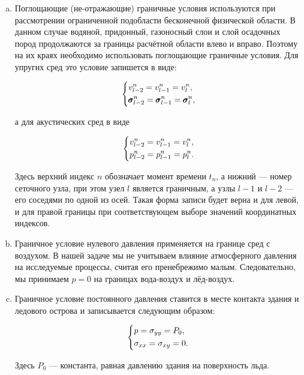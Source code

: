 \begin{enumerate}[a.]
    \item Поглощающие (не-отражающие) граничные условия используются при рассмотрении ограниченной подобласти бесконечной физической области. В данном случае водяной, придонный, газоносный слои и слой осадочных пород продолжаются за границы расчётной области влево и вправо. Поэтому на их краях необходимо использовать поглощающие граничные условия.  Для упругих сред это условие запишется в виде:
    
    \begin{equation*}
    \begin{dcases}
        v_{l-2}^n = 
        v_{l-1}^n = 
        v_{l}^n , \\
        \pmb{\sigma}_{l-2}^n = 
        \pmb{\sigma}_{l-1}^n = 
        \pmb{\sigma}_{l}^n ,
    \end{dcases}
    \end{equation*}
    
    а для акустических сред в виде
    
    \begin{equation*}
    \begin{dcases}
        v_{l-2}^n = 
        v_{l-1}^n = 
        v_{l}^n ,\\
        p_{l-2}^n = 
        p_{l-1}^n = 
        p_{l}^n .
    \end{dcases}
    \end{equation*}
    
    Здесь верхний индекс $n$ обозначает момент времени $t_n$, а нижний --- номер сеточного узла, при этом узел $l$ является граничным, а узлы $l-1$ и $l-2$ --- его соседями по одной из осей. Такая форма записи будет верна и для левой, и для правой границы при соответствующем выборе значений координатных индексов.
    
    \item Граничное условие нулевого давления применяется на границе сред с воздухом. В нашей задаче мы не учитываем влияние атмосферного давления на исследуемые процессы, считая его пренебрежимо малым. Следовательно, мы принимаем $p=0$ на границах вода-воздух и лёд-воздух.
    
    \item Граничное условие постоянного давления ставится в месте контакта здания и ледового острова и записывается следующим образом:
    
    \begin{equation*}
    \begin{dcases}
        p = \sigma_{yy} = P_0, \\
        \sigma_{xx} = \sigma_{xy} = 0 .
    \end{dcases}
    \end{equation*}
    
    Здесь $P_0$ --- константа, равная давлению здания на поверхность льда.
\end{enumerate}

